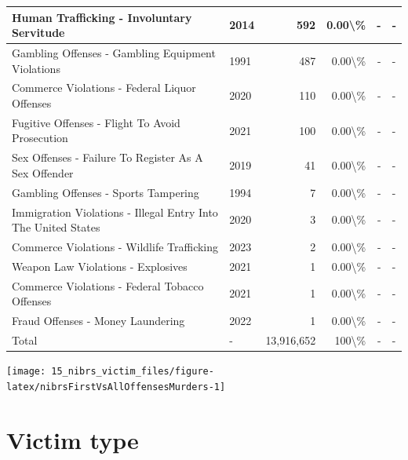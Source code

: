 \documentclass[
]{krantz}
\let\origfigure\figure
\let\endorigfigure\endfigure
\renewenvironment{figure}[1][2] {
    \expandafter\origfigure\expandafter[H]
} {
    \endorigfigure
}
\begin{document}
\begin{longtable}[t]{l|l|r|r|r|l}
\hline
Human Trafficking - Involuntary Servitude & 2014 & 592 & 0.00\textbackslash{}\% & - & -\\
\hline
Gambling Offenses - Gambling Equipment Violations & 1991 & 487 & 0.00\textbackslash{}\% & - & -\\
\hline
Commerce Violations - Federal Liquor Offenses & 2020 & 110 & 0.00\textbackslash{}\% & - & -\\
\hline
Fugitive Offenses - Flight To Avoid Prosecution & 2021 & 100 & 0.00\textbackslash{}\% & - & -\\
\hline
Sex Offenses - Failure To Register As A Sex Offender & 2019 & 41 & 0.00\textbackslash{}\% & - & -\\
\hline
Gambling Offenses - Sports Tampering & 1994 & 7 & 0.00\textbackslash{}\% & - & -\\
\hline
Immigration Violations - Illegal Entry Into The United States & 2020 & 3 & 0.00\textbackslash{}\% & - & -\\
\hline
Commerce Violations - Wildlife Trafficking & 2023 & 2 & 0.00\textbackslash{}\% & - & -\\
\hline
Weapon Law Violations - Explosives & 2021 & 1 & 0.00\textbackslash{}\% & - & -\\
\hline
Commerce Violations - Federal Tobacco Offenses & 2021 & 1 & 0.00\textbackslash{}\% & - & -\\
\hline
Fraud Offenses - Money Laundering & 2022 & 1 & 0.00\textbackslash{}\% & - & -\\
\hline
Total & - & 13,916,652 & 100\textbackslash{}\% & - & -\\
\hline
\end{longtable}

\begin{figure}

{\centering \texttt{[image: 15\_nibrs\_victim\_files/figure-latex/nibrsFirstVsAllOffensesMurders-1]} 

}

\caption{The share of victims when considering only the 1st offense reported compared to using all offenses, for murder and nonnegligent manslaughter, sex offenses, motor vehicle theft, and destruction of property/vandalism, 1991-2023.}\label{fig:nibrsFirstVsAllOffensesMurders}
\end{figure}

\section{Victim type}\label{victim-type}
\end{document}
